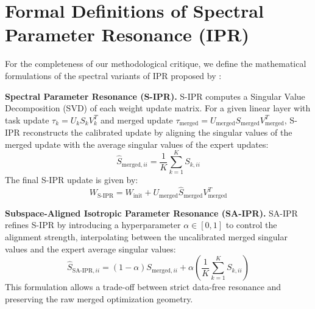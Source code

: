 \documentclass{article}
\begin{document}
\section{Formal Definitions of Spectral Parameter Resonance (IPR)}
\label{app:spectral}

For the completeness of our methodological critique, we define the mathematical formulations of the spectral variants of IPR proposed by \cite{submission9}:

\textbf{Spectral Parameter Resonance (S-IPR).} S-IPR computes a Singular Value Decomposition (SVD) of each weight update matrix. For a given linear layer with task update $\tau_k = U_k S_k V_k^T$ and merged update $\tau_{\text{merged}} = U_{\text{merged}} S_{\text{merged}} V_{\text{merged}}^T$, S-IPR reconstructs the calibrated update by aligning the singular values of the merged update with the average singular values of the expert updates:
\begin{equation}
\hat{S}_{\text{merged}, ii} = \frac{1}{K} \sum_{k=1}^K S_{k, ii}
\end{equation}
The final S-IPR update is given by:
\begin{equation}
W_{\text{S-IPR}} = W_{\text{init}} + U_{\text{merged}} \hat{S}_{\text{merged}} V_{\text{merged}}^T
\end{equation}

\textbf{Subspace-Aligned Isotropic Parameter Resonance (SA-IPR).} SA-IPR refines S-IPR by introducing a hyperparameter $\alpha \in [0, 1]$ to control the alignment strength, interpolating between the uncalibrated merged singular values and the expert average singular values:
\begin{equation}
\hat{S}_{\text{SA-IPR}, ii} = (1 - \alpha) S_{\text{merged}, ii} + \alpha \left( \frac{1}{K} \sum_{k=1}^K S_{k, ii} \right)
\end{equation}
This formulation allows a trade-off between strict data-free resonance and preserving the raw merged optimization geometry.
\end{document}
